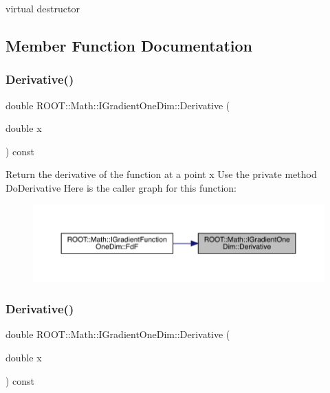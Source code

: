 virtual destructor 



\subsection{Member Function Documentation}
\mbox{\label{classROOT_1_1Math_1_1IGradientOneDim_a1fd109c1ddc7bae1c647f096e1fd527f}} 
\subsubsection{\texorpdfstring{Derivative()}{Derivative()}\hspace{0.1cm}{\footnotesize\ttfamily [1/4]}}
{\footnotesize\ttfamily double R\+O\+O\+T\+::\+Math\+::\+I\+Gradient\+One\+Dim\+::\+Derivative (\begin{DoxyParamCaption}\item[{double}]{x }\end{DoxyParamCaption}) const\hspace{0.3cm}{\ttfamily [inline]}}

Return the derivative of the function at a point x Use the private method Do\+Derivative Here is the caller graph for this function\+:\nopagebreak
\begin{figure}[H]
\begin{center}
\leavevmode
\includegraphics[width=350pt]{da/d8e/classROOT_1_1Math_1_1IGradientOneDim_a1fd109c1ddc7bae1c647f096e1fd527f_icgraph}
\end{center}
\end{figure}
\mbox{\label{classROOT_1_1Math_1_1IGradientOneDim_a1fd109c1ddc7bae1c647f096e1fd527f}} 
\subsubsection{\texorpdfstring{Derivative()}{Derivative()}\hspace{0.1cm}{\footnotesize\ttfamily [2/4]}}
{\footnotesize\ttfamily double R\+O\+O\+T\+::\+Math\+::\+I\+Gradient\+One\+Dim\+::\+Derivative (\begin{DoxyParamCaption}\item[{double}]{x }\end{DoxyParamCaption}) const\hspace{0.3cm}{\ttfamily [inline]}}

